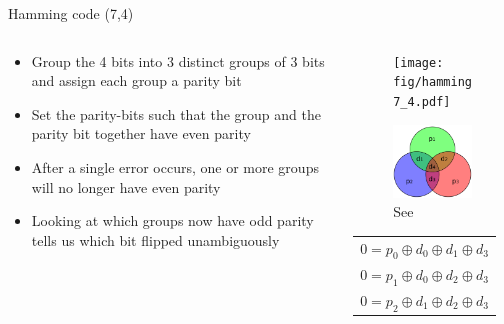 \documentclass[aspectratio=169,hyperref={pdfpagelabels=false}]{beamer}
\begin{document}
    \begin{frame}{Hamming code (7,4)}
    
    \begin{columns}
    
    \begin{column}{0.6\textwidth}
    
    \begin{itemize}
        \item Group the 4 bits into 3 distinct groups of 3 bits and assign each group a parity bit
        \item Set the parity-bits such that the group and the parity bit together have even parity
        \item After a single error occurs, one or more groups will no longer have even parity
        \item Looking at which groups now have odd parity tells us which bit flipped unambiguously
    \end{itemize}
    
    \end{column}
    
    
    
    \begin{column}{0.4\textwidth}
    \vspace{-1cm}
    \begin{figure}
        \centering
        \texttt{[image: fig/hamming7\_4.pdf]}
    \end{figure}
    
    \begin{figure}
        \includegraphics[width=3.3cm]{fig/Hamming(7,4).png}
        \caption{See\footnotemark}
    \end{figure}
    
    
    \begin{center}
    \begin{tabular}{c}
    $0 = p_0 \oplus d_0 \oplus d_1 \oplus d_3$ \\
    $0 = p_1 \oplus d_0 \oplus d_2 \oplus d_3$ \\
    $0 = p_2 \oplus d_1 \oplus d_2 \oplus d_3$
    \end{tabular}
    \end{center}
    \end{column}
    
    \end{columns}

        
    \end{frame}
    
\end{document}
